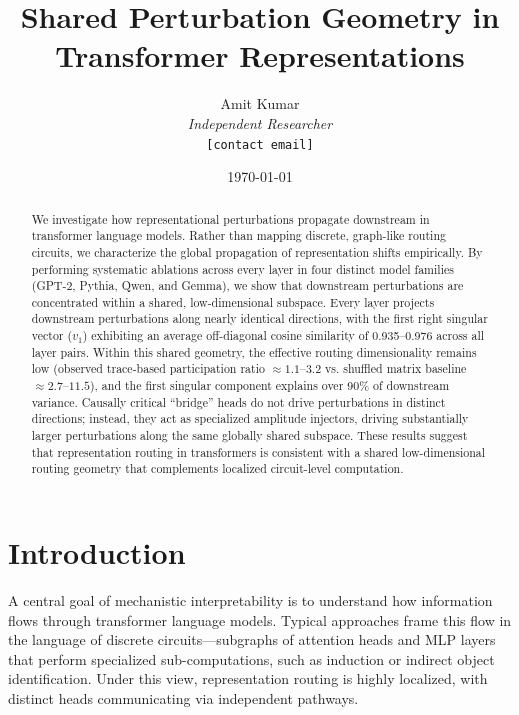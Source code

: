 \documentclass[11pt,a4paper]{article}
\title{%
    \LARGE\textbf{Shared Perturbation Geometry in Transformer Representations}%
}
\author{%
    Amit Kumar\\[2pt]
    \small\textit{Independent Researcher}\\
    \small\texttt{[contact email]}%
}
\date{\today}
\theoremstyle{definition}
\theoremstyle{plain}
\begin{document}
\maketitle
\thispagestyle{empty}

\begin{abstract}
\noindent
We investigate how representational perturbations propagate downstream in transformer language models. Rather than mapping discrete, graph-like routing circuits, we characterize the global propagation of representation shifts empirically. By performing systematic ablations across every layer in four distinct model families (GPT-2, Pythia, Qwen, and Gemma), we show that downstream perturbations are concentrated within a shared, low-dimensional subspace. Every layer projects downstream perturbations along nearly identical directions, with the first right singular vector ($v_1$) exhibiting an average off-diagonal cosine similarity of 0.935--0.976 across all layer pairs. Within this shared geometry, the effective routing dimensionality remains low (observed trace-based participation ratio $\approx 1.1$--$3.2$ vs. shuffled matrix baseline $\approx 2.7$--$11.5$), and the first singular component explains over 90\% of downstream variance. Causally critical ``bridge'' heads do not drive perturbations in distinct directions; instead, they act as specialized amplitude injectors, driving substantially larger perturbations along the same globally shared subspace. These results suggest that representation routing in transformers is consistent with a shared low-dimensional routing geometry that complements localized circuit-level computation.
\end{abstract}

\newpage
\setcounter{page}{1}
\tableofcontents
\vspace{2em}

\section{Introduction}
\label{sec:intro}

A central goal of mechanistic interpretability is to understand how information flows through transformer language models. Typical approaches frame this flow in the language of discrete circuits—subgraphs of attention heads and MLP layers that perform specialized sub-computations, such as induction or indirect object identification. Under this view, representation routing is highly localized, with distinct heads communicating via independent pathways.
\end{document}
